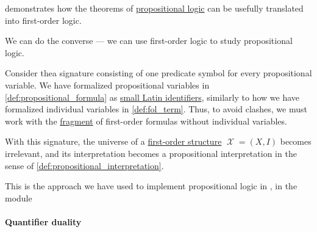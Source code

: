 \begin{remark}\label{rem:propositional_logic_as_first_order_logic}
   demonstrates how the theorems of \hyperref[def:propositional_logic]{propositional logic} can be usefully translated into first-order logic.

  We can do the converse --- we can use first-order logic to study propositional logic.

  Consider thea signature consisting of one predicate symbol for every propositional variable. We have formalized propositional variables in \cref{def:propositional_formula} as \hyperref[def:variable_identifier]{small Latin identifiers}, similarly to how we have formalized individual variables in \cref{def:fol_term}. Thus, to avoid clashes, we must work with the \hyperref[con:syntax_fragment]{fragment} of first-order formulas without individual variables.

  With this signature, the universe of a \hyperref[def:fol_structure]{first-order structure} \( \mscrX = (X, I) \) becomes irrelevant, and its interpretation becomes a propositional interpretation in the sense of \cref{def:propositional_interpretation}.

\end{remark}
\begin{comments}
  \item This is the approach we have used to implement propositional logic in \cite{notebook:code}, in the module
  \begin{CodeRefDisplay}
  \end{CodeRefDisplay}
\end{comments}

\paragraph{Quantifier duality}

